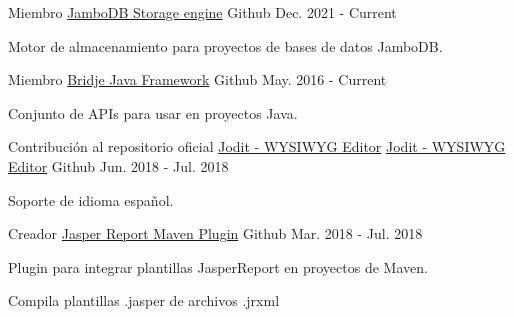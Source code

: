 
\begin{cventries}

  \cventry
    {Miembro} %
    {\href{https://github.com/jambodb/jambodb-storage}{JamboDB Storage engine}} %
    {\faGithubSquare\acvHeaderIconSep Github} %
    {Dec. 2021 - Current} %
    {
      \begin{cvitems} %
        \item {Motor de almacenamiento para proyectos de bases de datos JamboDB.}
      \end{cvitems}
    }

  \cventry
    {Miembro} %
    {\href{https://github.com/touwolf/bridje-framework}{Bridje Java Framework}} %
    {\faGithubSquare\acvHeaderIconSep Github} %
    {May. 2016 - Current} %
    {
      \begin{cvitems} %
        \item {Conjunto de APIs para usar en proyectos Java.}
      \end{cvitems}
    }

  \cventry
    {Contribución al repositorio oficial \href{https://github.com/xdan/jodit}{Jodit - WYSIWYG Editor}} %
    {\href{https://github.com/miche-atucha/jodit}{Jodit - WYSIWYG Editor}} %
    {\faGithubSquare\acvHeaderIconSep Github} %
    {Jun. 2018 - Jul. 2018} %
    {
      \begin{cvitems} %
        \item {Soporte de idioma español.}
      \end{cvitems}
    }

  \cventry
    {Creador} %
    {\href{https://github.com/miche-atucha/jasperreport-maven-plugin}{Jasper Report Maven Plugin}} %
    {\faGithubSquare\acvHeaderIconSep Github} %
    {Mar. 2018 - Jul. 2018} %
    {
      \begin{cvitems} %
        \item {Plugin para integrar plantillas JasperReport en proyectos de Maven.}
        \item {Compila plantillas .jasper de archivos .jrxml}
      \end{cvitems}
    }


\end{cventries}
